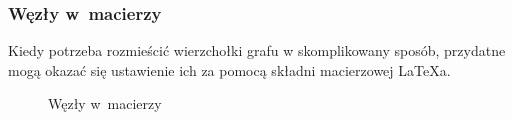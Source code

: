 \documentclass[10pt,t]{beamer}
\begin{document}
\begin{frame}
  \frametitle{Węzły w~macierzy}


  Kiedy potrzeba rozmieścić wierzchołki grafu w skomplikowany sposób,
  przydatne mogą okazać się ustawienie ich za pomocą składni
  macierzowej \LaTeX a.





  \begin{figure}

    \centering


    \begin{tikzpicture}







    \end{tikzpicture}


    \caption{Węzły w~macierzy}

  \end{figure}

\end{frame}
\end{document}
